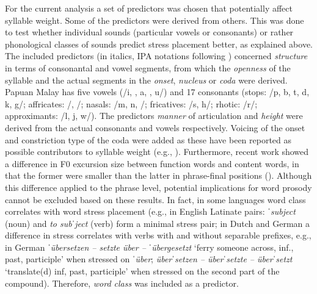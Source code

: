For the current analysis a set of predictors was chosen that potentially affect syllable weight. Some of the predictors were derived from others. This was done to test whether individual sounds (particular vowels or consonants) or rather phonological classes of sounds predict stress placement better, as explained above. The included predictors (in italics, IPA notations following \citealt{kluge_grammar_2017}) concerned \textit{structure} in terms of consonantal and vowel segments, from which the \textit{openness} of the syllable and the actual segments in the \textit{onset}, \textit{nucleus} or \textit{coda} were derived. Papuan Malay has five vowels (/i, , a, , u/) and 17 consonants (stops: /p, b, t, d, k, g/; affricates: /, /; nasals: /m, n, /; fricatives: /s, h/; rhotic: /r/; approximants: /l, j, w/). The predictors \textit{manner} of articulation and \textit{height} were derived from the actual consonants and vowels respectively. Voicing of the onset and constriction type of the coda were added as these have been reported as possible contributors to syllable weight (e.g., \citealt{ryan_onsets_2014}). Furthermore, recent work showed a difference in F0 excursion size between function words and content words, in that the former were smaller than the latter in phrase-final positions (\citealt{kaland_demarcating_2020}). Although this difference applied to the phrase level, potential implications for word prosody cannot be excluded based on these results. In fact, in some languages word class correlates with word stress placement (e.g., in English Latinate pairs: ˈ\textit{subject} (noun) and \textit{to sub}ˈ\textit{ject} (verb) form a minimal stress pair; in Dutch and German a difference in stress correlates with verbs with and without separable prefixes, e.g., in German ˈ\textit{übersetzen – setzte über – } ˈ\textit{übergesetzt} `ferry someone across, inf., past, participle' when stressed on ˈ\textit{über}; \textit{über}ˈ\textit{setzen – über}ˈ\textit{setzte – über}ˈ\textit{setzt} `translate(d) inf, past, participle' when stressed on the second part of the compound). Therefore, \textit{word class} was included as a predictor.


